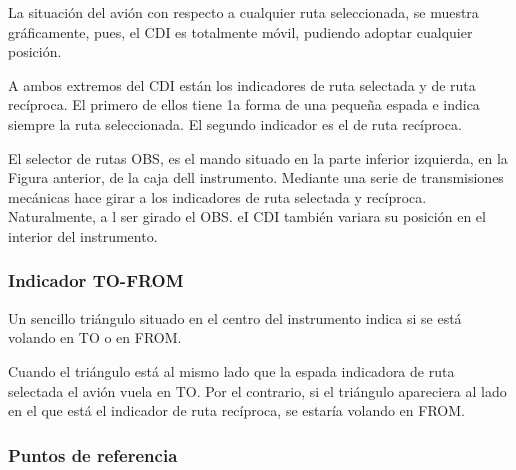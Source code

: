 La situación del avión con respecto a cualquier ruta seleccionada, se muestra gráficamente, pues, el CDI es totalmente móvil, pudiendo adoptar cualquier posición.

A ambos extremos del CDI están los indicadores de ruta selectada y de ruta recíproca. El primero de ellos tiene 1a forma de una pequeña espada e indica siempre la ruta seleccionada. El segundo indicador es el de ruta recíproca.

El selector de rutas OBS, es el mando situado en la parte inferior izquierda, en la Figura anterior, de la caja dell instrumento. Mediante una serie de transmisiones mecánicas hace girar a los indicadores de ruta selectada y recíproca. Naturalmente, a l ser girado el OBS. eI CDI también variara su posición en el interior del instrumento.

\subsubsection{Indicador TO-FROM}

Un sencillo triángulo situado en el centro del instrumento indica si se está volando en TO o en FROM.

Cuando el triángulo está al mismo lado que la espada indicadora de ruta selectada el avión vuela en TO. Por el contrario, si el triángulo apareciera al lado en el que está el indicador de ruta recíproca, se estaría volando en FROM.

\subsubsection{Puntos de referencia}

